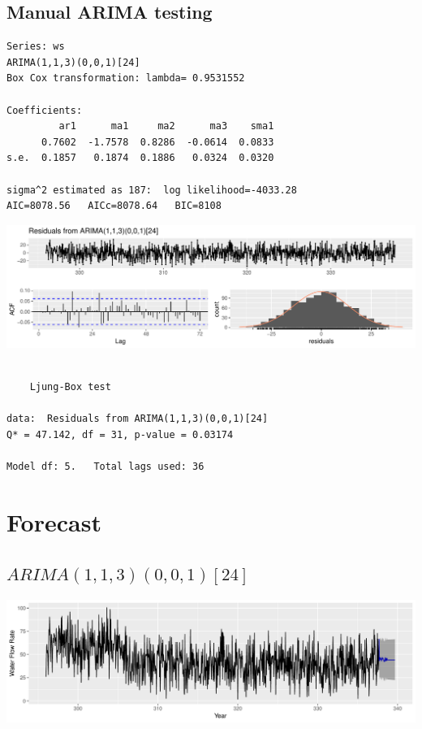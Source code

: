 \documentclass[openany]{book}
\begin{document}
\hypertarget{manual-arima-testing}{%
\subsection{Manual ARIMA testing}\label{manual-arima-testing}}

\begin{verbatim}
Series: ws 
ARIMA(1,1,3)(0,0,1)[24] 
Box Cox transformation: lambda= 0.9531552 

Coefficients:
         ar1      ma1     ma2      ma3    sma1
      0.7602  -1.7578  0.8286  -0.0614  0.0833
s.e.  0.1857   0.1874  0.1886   0.0324  0.0320

sigma^2 estimated as 187:  log likelihood=-4033.28
AIC=8078.56   AICc=8078.64   BIC=8108
\end{verbatim}

\includegraphics{Group2_Project1_Fall2019_files/figure-latex/unnamed-chunk-21-1.pdf}

\begin{verbatim}

    Ljung-Box test

data:  Residuals from ARIMA(1,1,3)(0,0,1)[24]
Q* = 47.142, df = 31, p-value = 0.03174

Model df: 5.   Total lags used: 36
\end{verbatim}

\hypertarget{forecast-2}{%
\section{Forecast}\label{forecast-2}}

\hypertarget{arima11300124}{%
\subsection{\texorpdfstring{\(ARIMA(1,1,3)(0,0,1)[24]\)}{ARIMA(1,1,3)(0,0,1){[}24{]}}}\label{arima11300124}}

\includegraphics{Group2_Project1_Fall2019_files/figure-latex/unnamed-chunk-22-1.pdf}
\end{document}
